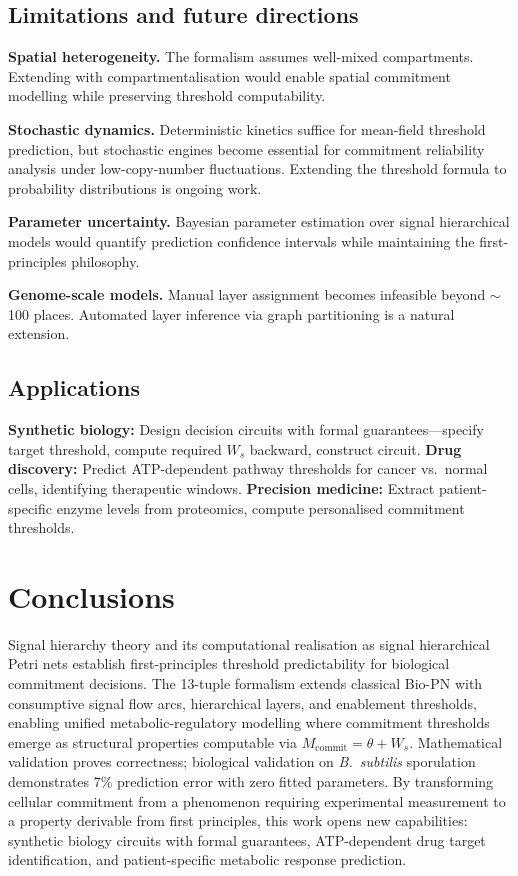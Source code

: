\documentclass[11pt,a4paper]{article}
\theoremstyle{plain}
\theoremstyle{definition}
\begin{document}
\subsection{Limitations and future directions}

\textbf{Spatial heterogeneity.} The formalism assumes well-mixed compartments. Extending with compartmentalisation would enable spatial commitment modelling while preserving threshold computability.

\textbf{Stochastic dynamics.} Deterministic kinetics suffice for mean-field threshold prediction, but stochastic engines become essential for commitment reliability analysis under low-copy-number fluctuations. Extending the threshold formula to probability distributions is ongoing work.

\textbf{Parameter uncertainty.} Bayesian parameter estimation over signal hierarchical models would quantify prediction confidence intervals while maintaining the first-principles philosophy.

\textbf{Genome-scale models.} Manual layer assignment becomes infeasible beyond $\sim$100 places. Automated layer inference via graph partitioning is a natural extension.

\subsection{Applications}

\textbf{Synthetic biology:} Design decision circuits with formal guarantees---specify target threshold, compute required $W_s$ backward, construct circuit. \textbf{Drug discovery:} Predict ATP-dependent pathway thresholds for cancer vs.\ normal cells, identifying therapeutic windows. \textbf{Precision medicine:} Extract patient-specific enzyme levels from proteomics, compute personalised commitment thresholds.


\section{Conclusions}

Signal hierarchy theory and its computational realisation as signal hierarchical Petri nets establish first-principles threshold predictability for biological commitment decisions. The 13-tuple formalism extends classical Bio-PN with consumptive signal flow arcs, hierarchical layers, and enablement thresholds, enabling unified metabolic-regulatory modelling where commitment thresholds emerge as structural properties computable via $M_{\mathrm{commit}} = \theta + W_s$. Mathematical validation proves correctness; biological validation on \textit{B.~subtilis} sporulation demonstrates 7\% prediction error with zero fitted parameters. By transforming cellular commitment from a phenomenon requiring experimental measurement to a property derivable from first principles, this work opens new capabilities: synthetic biology circuits with formal guarantees, ATP-dependent drug target identification, and patient-specific metabolic response prediction.
\end{document}
